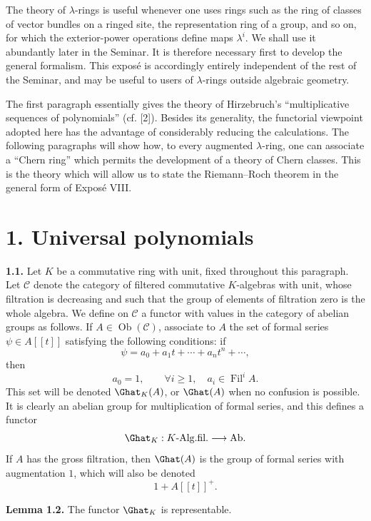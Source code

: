 \documentclass[11pt]{article}
\newcommand{\Fil}{\operatorname{Fil}}
\begin{document}
The theory of \(\lambda\)-rings is useful whenever one uses rings such as the ring of classes of vector bundles on a ringed site, the representation ring of a group, and so on, for which the exterior-power operations define maps \(\lambda^i\). We shall use it abundantly later in the Seminar. It is therefore necessary first to develop the general formalism. This exposé is accordingly entirely independent of the rest of the Seminar, and may be useful to users of \(\lambda\)-rings outside algebraic geometry.

The first paragraph essentially gives the theory of Hirzebruch's ``multiplicative sequences of polynomials'' (cf. [2]). Besides its generality, the functorial viewpoint adopted here has the advantage of considerably reducing the calculations. The following paragraphs will show how, to every augmented \(\lambda\)-ring, one can associate a ``Chern ring'' which permits the development of a theory of Chern classes. This is the theory which will allow us to state the Riemann--Roch theorem in the general form of Exposé VIII.

\section*{1. Universal polynomials}

\textbf{1.1.} Let \(K\) be a commutative ring with unit, fixed throughout this paragraph. Let \(\mathcal C\) denote the category of filtered commutative \(K\)-algebras with unit, whose filtration is decreasing and such that the group of elements of filtration zero is the whole algebra. We define on \(\mathcal C\) a functor with values in the category of abelian groups as follows. If \(A\in\operatorname{Ob}(\mathcal C)\), associate to \(A\) the set of formal series \(\psi\in A[[t]]\) satisfying the following conditions: if
\[
  \psi=a_0+a_1t+\cdots+a_nt^n+\cdots ,
\]
then
\begin{equation}\tag{1.1.1}
  a_0=1,\qquad \forall i\geq 1,\quad a_i\in \Fil^i A .
\end{equation}
This set will be denoted \(\Ghat_K(A)\), or \(\Ghat(A)\) when no confusion is possible. It is clearly an abelian group for multiplication of formal series, and this defines a functor
\[
  \Ghat_K:K\text{-Alg.fil.}\longrightarrow \mathrm{Ab}.
\]
If \(A\) has the gross filtration, then \(\Ghat(A)\) is the group of formal series with augmentation \(1\), which will also be denoted
\[
  1+A[[t]]^+.
\]

\textbf{Lemma 1.2.} The functor \(\Ghat_K\) is representable.
\end{document}
